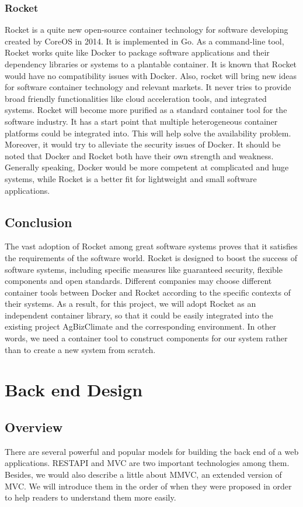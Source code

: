 \documentclass[letterpaper,10pt]{article}
\begin{document}
		\subsubsection{Rocket}
    Rocket is a quite new open-source container technology for software developing created by CoreOS in 2014. It is implemented in Go. As a command-line tool, Rocket works quite like Docker to package software applications and their dependency libraries or systems to a plantable container. It is known that Rocket would have no compatibility issues with Docker. Also, rocket will bring new ideas for software container technology and relevant markets. It never tries to provide broad friendly functionalities like cloud acceleration tools, and integrated systems. Rocket will become more purified as a standard container tool for the software industry. It has a start point that multiple heterogeneous container platforms could be integrated into. This will help solve the availability problem. Moreover, it would try to alleviate the security issues of Docker. It should be noted that Docker and Rocket both have their own strength and weakness. Generally speaking, Docker would be more competent at complicated and huge systems, while Rocket is a better fit for lightweight and small software applications.

	\subsection{Conclusion}
  The vast adoption of Rocket among great software systems proves that it satisfies the requirements of the software world. Rocket is designed to boost the success of software systems, including specific measures like guaranteed security, flexible components and open standards. Different companies may choose different container tools between Docker and Rocket according to the specific contexts of their systems.
  As a result, for this project, we will adopt Rocket as an independent container library, so that it could be easily integrated into the existing project AgBizClimate and the corresponding environment. In other words, we need a container tool to construct components for our system rather than to create a new system from scratch.


\section{Back end Design}
	\subsection{Overview}
        There are several powerful and popular models for building the back end of a web applications. RESTAPI and MVC are two important technologies among them. Besides, we would also describe a little about MMVC, an extended version of MVC. We will introduce them in the order of when they were proposed in order to help readers to understand them more easily.
\end{document}

